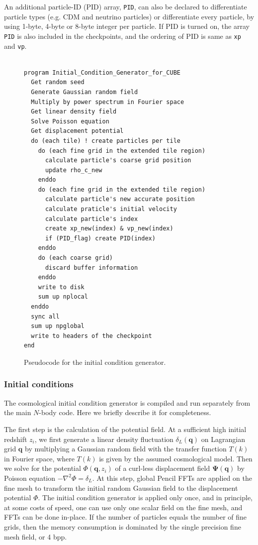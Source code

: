 \documentclass[10pt,twocolumn,preprint]{emulateapj}
\newcommand{\bs}{\boldsymbol}
\begin{document}
An additional particle-ID (PID) array, {\tt PID}, can also be declared to differentiate particle types (e.g. CDM and neutrino particles) or differentiate every particle, by using 1-byte, 4-byte or 8-byte integer per particle. If PID is turned on, the array {\tt PID} is also included in the checkpoints, and the ordering of PID is same as {\tt xp} and {\tt vp}.

\begin{figure}[t]
\begin{verbatim}

program Initial_Condition_Generator_for_CUBE
  Get random seed
  Generate Gaussian random field
  Multiply by power spectrum in Fourier space
  Get linear density field
  Solve Poisson equation
  Get displacement potential  
  do (each tile) ! create particles per tile
    do (each fine grid in the extended tile region)
      calculate particle's coarse grid position
      update rho_c_new
    enddo
    do (each fine grid in the extended tile region)
      calculate particle's new accurate position
      calculate praticle's initial velocity
      calculate particle's index
      create xp_new(index) & vp_new(index)
      if (PID_flag) create PID(index)
    enddo
    do (each coarse grid)
      discard buffer information
    enddo
    write to disk
    sum up nplocal
  enddo
  sync all
  sum up npglobal
  write to headers of the checkpoint
end
\end{verbatim}
\caption{Pseudocode for the initial condition generator.}
\label{fig.ic}
\end{figure}

\subsubsection{Initial conditions}\label{sss.ic}
The cosmological initial condition generator is compiled and run separately from the main $N$-body code. Here we briefly describe it for completeness.

The first step is the calculation of the potential field. At a sufficient high initial redshift $z_i$, we first generate a linear density fluctuation $\delta_L({\bs q})$ on Lagrangian grid ${\bs q}$ by multiplying a Gaussian random field with the transfer function $T(k)$ in Fourier space, where $T(k)$ is given by the assumed cosmological model. Then we solve for the potential ${\Phi({\bs q}, z_i)}$ of a curl-less displacement field ${\bs\Psi({\bs q})}$ by Poisson equation $-\nabla^2\Phi=\delta_L$. At this step, global Pencil FFTs are applied on the fine mesh to transform the initial random Gaussian field to the displacement potential $\Phi$. The initial condition generator is applied only once, and in principle, at some costs of speed, one can use only one scalar field on the fine mesh, and FFTs can be done in-place. If the number of particles equals the number of fine grids, then the memory consumption is dominated by the single precision fine mesh field, or 4 bpp.
\end{document}
